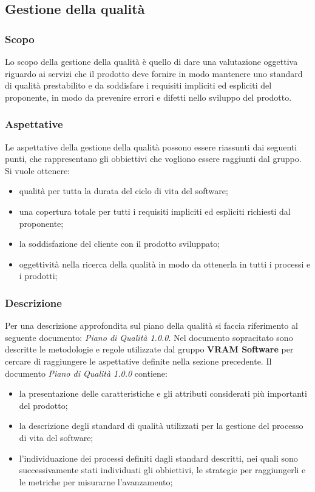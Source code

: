 \subsection{Gestione della qualità}
	\subsubsection{Scopo}
	Lo scopo della gestione della qualità è quello di dare una valutazione oggettiva riguardo ai servizi che il prodotto deve fornire in modo mantenere uno standard di qualità prestabilito e da soddisfare i requisiti impliciti ed espliciti del proponente, in modo da prevenire errori e difetti nello sviluppo del prodotto.
	\subsubsection{Aspettative}
	Le aspettative della gestione della qualità possono essere riassunti dai seguenti punti, che rappresentano gli obbiettivi che vogliono essere raggiunti dal gruppo. Si vuole ottenere:
	\begin{itemize}
		\item qualità per tutta la durata del ciclo di vita del software;
		\item una copertura totale per tutti i requisiti impliciti ed espliciti richiesti dal proponente;
		\item la soddisfazione del cliente con il prodotto sviluppato;
		\item oggettività nella ricerca della qualità in modo da ottenerla in tutti i processi e i prodotti;
	\end{itemize}
	\subsubsection{Descrizione}
	Per una descrizione approfondita sul piano della qualità si faccia riferimento al seguente documento: \textit{Piano di Qualità 1.0.0}.
	Nel documento sopracitato sono descritte le metodologie e regole utilizzate dal gruppo \textbf{VRAM Software} per cercare di raggiungere le aspettative definite nella sezione precedente.
	Il documento \textit{Piano di Qualità 1.0.0} contiene:
	\begin{itemize}
		\item la presentazione delle caratteristiche e gli attributi considerati più importanti del prodotto;
		\item la descrizione degli standard di qualità utilizzati per la gestione del processo di vita del software;
		\item l'individuazione dei processi definiti dagli standard descritti, nei quali sono successivamente stati individuati gli obbiettivi, le strategie per raggiungerli e le metriche per misurarne l'avanzamento;
	\end{itemize}
	
